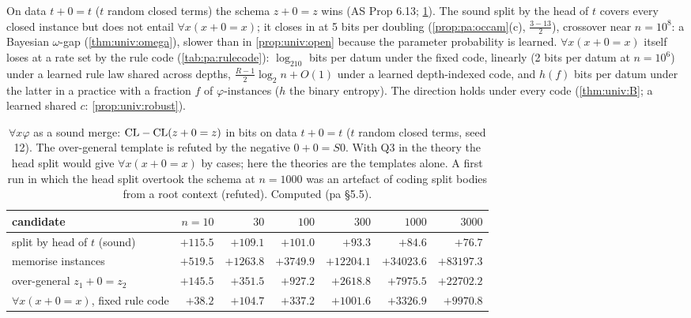 \begin{remark}\pabrk{}\label{rem:pa:merge}
On data $t+0=t$ ($t$ random closed terms) the schema $z+0=z$ wins (AS Prop 6.13; \cref{tab:pa:merge}). The sound split by the head of $t$ covers every closed instance but does not entail $\forall x(x+0=x)$; it closes in at 5 bits per doubling (\cref{prop:pa:occam}(c), $\frac{3-13}2$), crossover near $n=10^8$: a Bayesian $\omega$-gap (\cref{thm:univ:omega}), slower than in \cref{prop:univ:open} because the parameter probability is learned. $\forall x(x+0=x)$ itself loses at a rate set by the rule code (\cref{tab:pa:rulecode}): $\log_210$ bits per datum under the fixed code, linearly (2 bits per datum at $n=10^6$) under a learned rule law shared across depths, $\frac{R-1}2\log_2n+O(1)$ under a learned depth-indexed code, and $h(f)$ bits per datum under the latter in a practice with a fraction $f$ of $\varphi$-instances ($h$ the binary entropy). The direction holds under every code (\cref{thm:univ:B}; a learned shared $c$: \cref{prop:univ:robust}).
\end{remark}

\begin{table}[ht]\centering\footnotesize
\begin{tabular}{@{}lrrrrrr@{}}
\toprule
candidate & $n=10$ & $30$ & $100$ & $300$ & $1000$ & $3000$\\
\midrule
split by head of $t$ (sound) & $+115.5$ & $+109.1$ & $+101.0$ & $+93.3$ & $+84.6$ & $+76.7$\\
memorise instances & $+519.5$ & $+1263.8$ & $+3749.9$ & $+12204.1$ & $+34023.6$ & $+83197.3$\\
over-general $z_1+0=z_2$ & $+145.5$ & $+351.5$ & $+927.2$ & $+2618.8$ & $+7975.5$ & $+22702.2$\\
$\forall x(x+0=x)$, fixed rule code & $+38.2$ & $+104.7$ & $+337.2$ & $+1001.6$ & $+3326.9$ & $+9970.8$\\
\bottomrule
\end{tabular}
\caption{$\forall x\varphi$ as a sound merge: $\mathrm{CL}-\mathrm{CL}(z+0=z)$ in bits on data $t+0=t$ ($t$ random closed terms, seed 12). The over-general template is refuted by the negative $0+0=S0$. With Q3 in the theory the head split would give $\forall x(x+0=x)$ by cases; here the theories are the templates alone. A first run in which the head split overtook the schema at $n=1000$ was an artefact of coding split bodies from a root context (refuted). Computed (pa \S5.5).}\label{tab:pa:merge}
\end{table}

